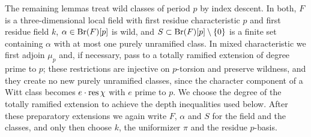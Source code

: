 The remaining lemmas treat wild classes of period $p$ by index descent.
In both, $F$ is a three-dimensional local field with first residue characteristic $p$ and first residue field $k$, $\alpha\in\operatorname{Br}(F)[p]$ is wild, and $S\subset\operatorname{Br}(F)[p]\setminus\{0\}$ is a finite set containing $\alpha$ with at most one purely unramified class.
In mixed characteristic we first adjoin $\mu_p$ and, if necessary, pass to a totally ramified extension of degree prime to $p$; these restrictions are injective on $p$-torsion and preserve wildness, and they create no new purely unramified classes, since the character component of a Witt class becomes $e\cdot\operatorname{res}\chi$ with $e$ prime to $p$.
We choose the degree of the totally ramified extension to achieve the depth inequalities used below.
After these preparatory extensions we again write $F$, $\alpha$ and $S$ for the field and the classes, and only then choose $k$, the uniformizer $\pi$ and the residue $p$-basis.

